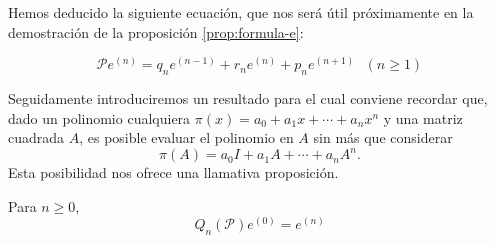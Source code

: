    Hemos deducido la siguiente ecuación, que nos será útil próximamente en la demostración de la proposición \ref{prop:formula-e}:

    \begin{equation}
        \label{eq:Pen}
        \mathcal{P}e^{(n)} =  q_n e^{(n-1)} + r_n  e^{(n)} + p_n e^{(n+1)} \ \ \ (n\geq 1)
    \end{equation}

    Seguidamente introduciremos un resultado para el cual conviene recordar que, dado un polinomio cualquiera $\pi(x)= a_0 + a_1 x + \cdots + a_n x^n$ y una matriz cuadrada $A$, es posible evaluar el polinomio en $A$ sin más que considerar
    $$
    \pi(A) = a_0 I + a_1 A + \cdots + a_n A^n.
    $$
    Esta posibilidad nos ofrece una llamativa proposición.

    \begin{proposicion}
        \label{prop:formula-e}
        Para $n\geq 0$,
        \begin{equation}
            Q_n(\mathcal{P})e^{(0)} = e^{(n)}
        \end{equation}
    \end{proposicion}
